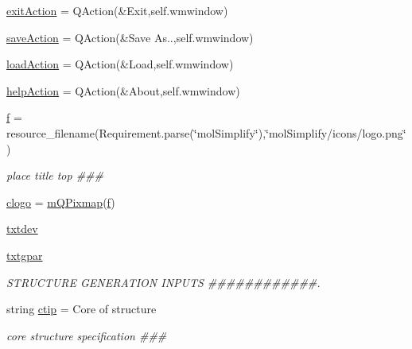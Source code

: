 \begin{DoxyCompactItemize}
\item 
\hyperlink{classmolSimplify_1_1Classes_1_1mGUI_1_1mGUI_adf2d44eeea440345eca1291bc7c10f82}{exit\+Action} = Q\+Action(\textquotesingle{}\&Exit\textquotesingle{},self.\+wmwindow)
\item 
\hyperlink{classmolSimplify_1_1Classes_1_1mGUI_1_1mGUI_ae3efab33323abd42c4e34bbbf53ca3c7}{save\+Action} = Q\+Action(\textquotesingle{}\&Save As..\textquotesingle{},self.\+wmwindow)
\item 
\hyperlink{classmolSimplify_1_1Classes_1_1mGUI_1_1mGUI_a163c5b15bff992cb0283c147c8252b38}{load\+Action} = Q\+Action(\textquotesingle{}\&Load\textquotesingle{},self.\+wmwindow)
\item 
\hyperlink{classmolSimplify_1_1Classes_1_1mGUI_1_1mGUI_a7d6de3970d5912ba5afd3270d97f9717}{help\+Action} = Q\+Action(\textquotesingle{}\&About\textquotesingle{},self.\+wmwindow)
\item 
\hyperlink{classmolSimplify_1_1Classes_1_1mGUI_1_1mGUI_a76137d1ef407b43266e051d20d866478}{f} = resource\+\_\+filename(Requirement.\+parse(\char`\"{}mol\+Simplify\char`\"{}),\char`\"{}mol\+Simplify/icons/logo.\+png\char`\"{})
\begin{DoxyCompactList}\small\item\em place title top \#\#\# \end{DoxyCompactList}\item 
\hyperlink{classmolSimplify_1_1Classes_1_1mGUI_1_1mGUI_a6893e6dddb84445671e0e42f3859df04}{clogo} = \hyperlink{classmolSimplify_1_1Classes_1_1mWidgets_1_1mQPixmap}{m\+Q\+Pixmap}(\hyperlink{classmolSimplify_1_1Classes_1_1mGUI_1_1mGUI_a76137d1ef407b43266e051d20d866478}{f})
\item 
\hyperlink{classmolSimplify_1_1Classes_1_1mGUI_1_1mGUI_abb44a93da2a52ed9e05cf72e5446a450}{txtdev}
\item 
\hyperlink{classmolSimplify_1_1Classes_1_1mGUI_1_1mGUI_a90ef3b9ea17c227e1dce1692d6c52cdf}{txtgpar}
\begin{DoxyCompactList}\small\item\em S\+T\+R\+U\+C\+T\+U\+RE G\+E\+N\+E\+R\+A\+T\+I\+ON I\+N\+P\+U\+TS \#\#\#\#\#\#\#\#\#\#\#\#. \end{DoxyCompactList}\item 
string \hyperlink{classmolSimplify_1_1Classes_1_1mGUI_1_1mGUI_a1b133e03d1e22efde4e654f152644c7b}{ctip} = \textquotesingle{}Core of structure\textquotesingle{}
\begin{DoxyCompactList}\small\item\em core structure specification \#\#\# \end{DoxyCompactList}\item 

\end{DoxyCompactItemize}
